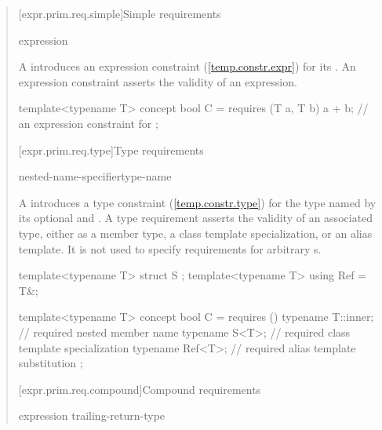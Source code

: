 \begin{quote}
[expr.prim.req.simple]{Simple requirements}

\begin{bnf}
\br
    expression \terminal{;}
\end{bnf}

\pnum
A  introduces an expression 
constraint (\ref{temp.constr.expr}) for its 
.
\enternote
An expression constraint asserts the validity of an expression.
\exitnote

\enterexample
\begin{codeblock}
template<typename T> concept bool C =
  requires (T a, T b) {
    a + b;  // an expression constraint for 
  };
\end{codeblock}
\exitexample


[expr.prim.req.type]{Type requirements}

\begin{bnf}
\br
     nested-name-specifier\opt type-name \terminal{;}
\end{bnf}

\pnum
A  introduces a type 
constraint (\ref{temp.constr.type}) for the type named by its
optional  and .
%
\enternote
A type requirement asserts the validity of an associated
type, either as a member type, a class template specialization,
or an alias template. It is not used to specify requirements for
arbitrary s.
\exitnote
%
\enterexample
\begin{codeblock}
template<typename T> struct S { };
template<typename T> using Ref = T&;

template<typename T> concept bool C =
  requires () {
    typename T::inner; // required nested member name
    typename S<T>;     // required class template specialization
    typename Ref<T>;   // required alias template substitution
  };
\end{codeblock}
\exitexample


[expr.prim.req.compound]{Compound requirements}
      
\begin{bnf}
\br
  \terminal{\{} expression \terminal{\}} \opt 
    trailing-return-type\opt~\terminal{;}
\end{bnf}


\end{quote}
